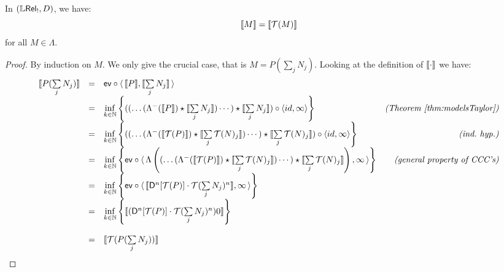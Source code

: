 \begin{theorem}[Corollary~\ref{cor:T(M)=M}]
 In $(\mathbb{L} \mathsf{Rel}_!,D)$, we have:
 \[ \llbracket M\rrbracket = \llbracket\mathcal{T}(M)\rrbracket \]
for all $M\in\Lambda$.
\end{theorem}
\begin{proof}
 By induction on $M$.
 We only give the crucial case, that is $M=P\left(\sum\limits_j N_j\right)$.
Looking at the definition of $\llbracket\cdot\rrbracket$ we have:
 \[\begin{array}{rclr}
	\llbracket P(\sum\limits_j N_j)\rrbracket 
	& = &
	 \mathsf{ev} \circ \langle \, \llbracket P\rrbracket, \llbracket\sum\limits_j N_j\rrbracket  \, \rangle
	&
	\\
	& = &
	 \inf\limits_{k\in\mathbb{N}}\left\{
	 ((\dots (\Lambda^-(\llbracket P\rrbracket)\star \llbracket\sum\limits_j N_j\rrbracket)\cdots ) \star \llbracket\sum\limits_j N_j\rrbracket )
	 \circ \langle id,\infty \rangle \right\}
	&
	\textit{(Theorem~\ref{thm:modelsTaylor})}
	\\
	& = &
	 \inf\limits_{k\in\mathbb{N}}\left\{
	 ((\dots (\Lambda^-(\llbracket\mathcal{T}(P)\rrbracket)\star \llbracket\sum\limits_j \mathcal{T}(N)_j\rrbracket)\cdots ) \star \llbracket\sum\limits_j \mathcal{T}(N)_j\rrbracket )
	 \circ \langle id,\infty \rangle \right\}
	&
	\textit{(ind.\ hyp.)}
	\\
	& = &
	 \inf\limits_{k\in\mathbb{N}}\left\{
	 \mathsf{ev} \circ \langle\, \Lambda\left(
	 (\dots (\Lambda^-(\llbracket\mathcal{T}(P)\rrbracket)\star \llbracket\sum\limits_j \mathcal{T}(N)_j\rrbracket)\cdots ) \star \llbracket\sum\limits_j \mathcal{T}(N)_j\rrbracket
	 \right) , \infty \, \rangle \right\}
	& \textit{(general property of CCC's)}
	\\
	& = &
	 \inf\limits_{k\in\mathbb{N}}\left\{
	 \mathsf{ev} \circ \langle\, \llbracket\mathsf{D}^n [\mathcal{T}(P)] \cdot \mathcal{T}(\sum\limits_j N_j)^n\rrbracket, \infty \, \rangle \right\}
	&
	\\
	& = &
	 \inf\limits_{k\in\mathbb{N}}\left\{\llbracket(\mathsf{D}^n [\mathcal{T}(P)] \cdot \mathcal{T}(\sum\limits_j N_j)^n)0\rrbracket \right\}
	&
	\\ \\
	& = &
	 \llbracket\mathcal{T}(P(\sum\limits_j N_j))\rrbracket
	&
 \end{array}\]
\end{proof}




